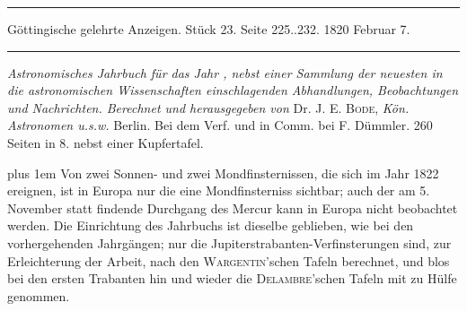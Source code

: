 \par\bigskip
\hypertarget{native-624-lower}{}
\begin{center}
\parbox{.92\linewidth}{\centering\small
\rule{\linewidth}{.3pt}\par\smallskip
Göttingische gelehrte Anzeigen. Stück 23. Seite 225..232. 1820 Februar 7.\par\smallskip
\rule{\linewidth}{.3pt}}
\end{center}
\par\medskip

\emph{Astronomisches Jahrbuch für das Jahr {}, nebst einer Sammlung der neuesten in die astronomischen Wissenschaften einschlagenden Abhandlungen, Beobachtungen und Nachrichten. Berechnet und herausgegeben von} Dr. J. E. \textsc{Bode}, \emph{Kön. Astronomen u.s.w.} Berlin. Bei dem Verf. und in Comm. bei F. Dümmler. 260 Seiten in 8. nebst einer Kupfertafel.

\begingroup\rightskip=0pt plus 1em
Von zwei Sonnen- und zwei Mondfinsternissen, die sich im Jahr 1822 ereignen, ist in Europa nur die eine Mondfinsterniss sichtbar; auch der am 5. November statt findende Durchgang des Mercur kann in Europa nicht beobachtet werden. Die Einrichtung des Jahrbuchs ist dieselbe geblieben, wie bei den vorhergehenden Jahrgängen; nur die Jupiterstrabanten-Verfinsterungen sind, zur Erleichterung der Arbeit, nach den \textsc{Wargentin}'schen Tafeln berechnet, und blos bei den ersten Trabanten hin und wieder die \textsc{Delambre}'schen Tafeln mit zu Hülfe genommen.\par\endgroup

